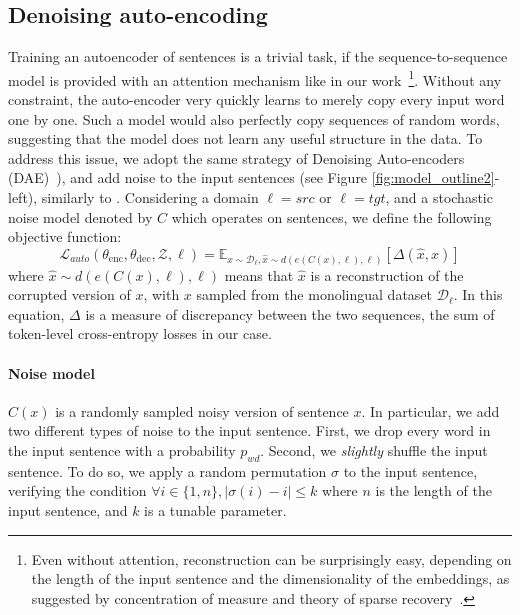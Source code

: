 \documentclass{article} \usepackage{iclr2018_conference,times}
\begin{document}
\subsection{Denoising auto-encoding} \label{sec:ae} Training an autoencoder of sentences is a trivial task, if the sequence-to-sequence model is provided with an attention mechanism like in our work~\footnote{Even without attention, reconstruction can be surprisingly easy, depending on the length of the input sentence and the dimensionality of the embeddings, as suggested by concentration of measure and theory of sparse recovery~\citep{compressedsensing}.}. Without any constraint,  the auto-encoder very quickly learns to merely copy every input word one by one. Such a model would also perfectly copy sequences of random words, suggesting that the model does not learn any useful structure in the data.  To address this issue, we adopt the same strategy of Denoising Auto-encoders (DAE)~\citep{vincent2008extracting}), and add noise to the input sentences (see Figure \ref{fig:model_outline2}-left), similarly to \cite{hill2016learning}. Considering a domain $\ell=src$ or $\ell=tgt$, and a stochastic noise model denoted by $C$ which operates on sentences, we define the following objective function:
\begin{equation}
    \mathcal{L}_{auto}(\theta_\mathrm{enc},\theta_\mathrm{dec},\mathcal{Z},\ell) = \mathbb{E}_{x \sim \mathcal{D}_\ell,\hat{x} \sim d(e(C(x),\ell),\ell)} \left[\Delta(\hat{x},x) \right]
\end{equation}
where $\hat{x} \sim d(e(C(x),\ell),\ell)$ means that $\hat{x}$ is a reconstruction of the corrupted version of $x$, with $x$ sampled from the monolingual dataset $\mathcal{D}_\ell$.  In this equation, $\Delta$ is a
measure of discrepancy between the two sequences, the sum of token-level cross-entropy losses in our case.

\paragraph{Noise model} $C(x)$ is a randomly sampled noisy version of sentence $x$. In particular, we add two different types of noise to the input sentence. First, we drop every word in the input sentence with a probability $p_{wd}$. Second, we \textit{slightly} shuffle the input sentence. To do so, we apply a random permutation $\sigma$ to the input sentence, verifying the condition $\forall i \in \{1, n\}, | \sigma (i) - i | \leq k$ where $n$ is the length of the input sentence, and $k$ is a tunable parameter. 
\end{document}
